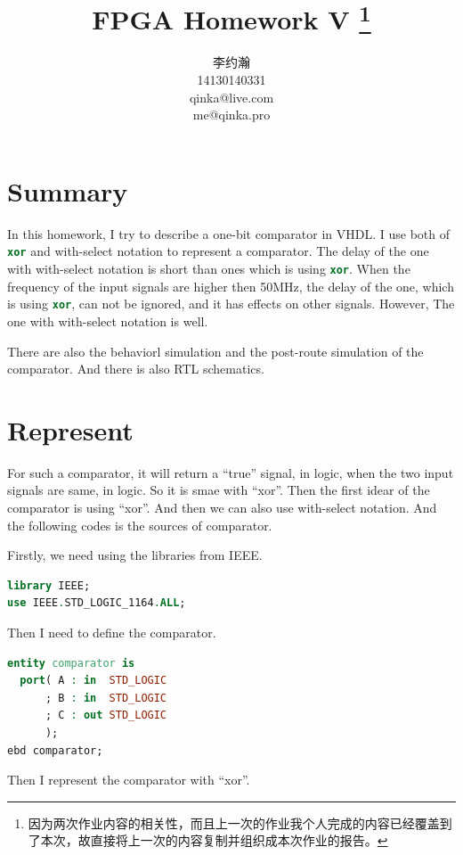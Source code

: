 \documentclass{article}
\title{FPGA Homework V \thanks{因为两次作业内容的相关性，而且上一次的作业我个人完成的内容已经覆盖到了本次，故直接将上一次的内容复制并组织成本次作业的报告。}}
\author{李约瀚 \\ 14130140331 \\ qinka@live.com \\ me@qinka.pro }
\begin{document}
    \maketitle
    \newpage
    \tableofcontents
    \newpage
    \section{Summary}
    \label{sec:summary}
    
    In this homework, I try to describe a one-bit comparator in VHDL.
    I use both of \lstinline[language=VHDL]|xor| and with-select notation to represent a comparator. 
    The delay of the one with with-select notation is short than ones which is using \lstinline[language=VHDL]|xor|.
    When the frequency of the input signals  are higher then 50MHz,
    the delay of the one, which is using \lstinline[language=VHDL]|xor|, can not be ignored,
    and it has effects on other signals. However, The one with with-select notation is well.

    There are also the behaviorl simulation and the post-route simulation of the comparator.
    And there is also RTL schematics.


    \section{Represent}
    \label{sec:represent}

    For such a comparator, it will return a ``true'' signal, in logic, when the two input signals are same, in logic.
    So it is smae with ``xor''. Then the first idear of the comparator is using ``xor''. And then we can also use with-select notation.
    And the following codes is the sources of comparator.

    Firstly, we need using the libraries from IEEE.

\begin{lstlisting}[language=VHDL]
library IEEE;
use IEEE.STD_LOGIC_1164.ALL;
\end{lstlisting}

    Then I need to define the comparator.

\begin{lstlisting}[language=VHDL]
entity comparator is
  port( A : in  STD_LOGIC
      ; B : in  STD_LOGIC
      ; C : out STD_LOGIC
      );
ebd comparator;
\end{lstlisting}

    Then I represent the comparator with ``xor''.
\end{document}
